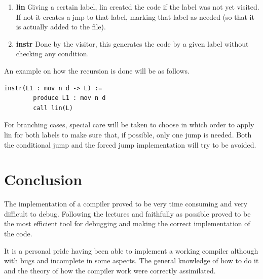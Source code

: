 \documentclass[conference]{IEEEtran}
\theoremstyle{definition}
\begin{document}
\begin{enumerate}
	\item \textbf{lin} Giving a certain label, lin created the code if the label was not yet visited. If not it creates a jmp to that label, marking that label as needed (so that it is actually added to the file).
	\item \textbf{instr} Done by the visitor, this generates the code by a given label without checking any condition.
\end{enumerate}

An example on how the recursion is done will be as follows.
\begin{lstlisting}
instr(L1 : mov n d -> L) :=
		produce L1 : mov n d
		call lin(L)
\end{lstlisting}

For branching cases, special care will be taken to choose in which order to apply lin for both labels to make sure that, if possible, only one jump is needed. Both the conditional jump and the forced jump implementation will try to be avoided.

\section{Conclusion}

The implementation of a compiler proved to be very time consuming and very difficult to debug. Following the lectures and faithfully as possible proved to be the most efficient tool for debugging and making the correct implementation of the code.

It is a personal pride having been able to implement a working compiler although with bugs and incomplete in some aspects. The general knowledge of how to do it and the theory of how the compiler work were correctly assimilated.


\newpage
{}


\end{document}
